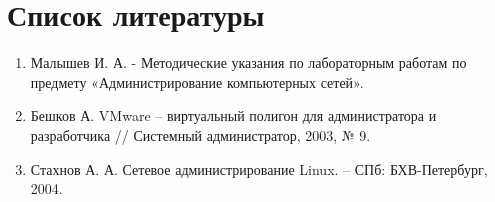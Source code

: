 \documentclass[a4paper, 12pt]{article}		%
\begin{document}

\newpage
\section*{Список литературы}

\begin{enumerate}
\item Малышев И. А. - Методические указания по лабораторным работам по предмету «Администрирование компьютерных сетей».
\item Бешков А. VMware – виртуальный полигон для администратора и разработчика // Системный администратор, 2003, № 9.
\item Стахнов А. А. Сетевое администрирование Linux. – СПб: БХВ-Петербург, 2004.
\end{enumerate}
\end{document}
